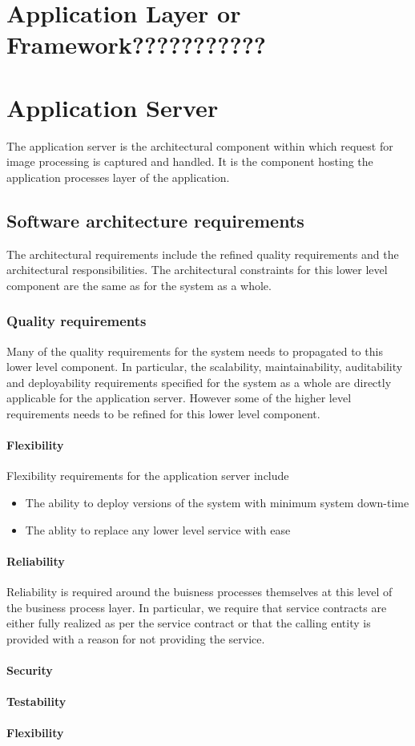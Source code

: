 \documentclass[a4paper,12pt]{report}
\begin{document}
\section {Application Layer or Framework???????????}

\section {Application Server}
The application server is the architectural component within which request for image processing is captured and handled. It is the component hosting the application processes layer of the application.

\subsection {Software architecture requirements}
The architectural requirements include the refined quality requirements and the architectural responsibilities. The architectural constraints for this lower level component are the same as for the system as a whole.

\subsubsection {Quality requirements}
Many of the quality requirements for the system needs to propagated to this lower level component.
In particular, the scalability, maintainability, auditability and deployability requirements specified for the system as a whole are directly applicable for the application server. However some of the higher level requirements needs to be refined for this lower level component.

\paragraph {Flexibility} 
\hfill \break
 Flexibility requirements for the application server include
	\begin{itemize}
		\item The ability to deploy versions of the system with minimum system down-time
		\item The ablity to replace any lower level service with ease
	\end{itemize}
\paragraph {Reliability}
\hfill \break
	Reliability is required around the buisness processes themselves at this level of the business process layer.
	In particular, we require that service contracts are either fully realized as per the service contract or that the calling entity is provided with a reason  for not providing the service.
\paragraph {Security}
\paragraph {Testability}
\paragraph {Flexibility}
\end{document}
